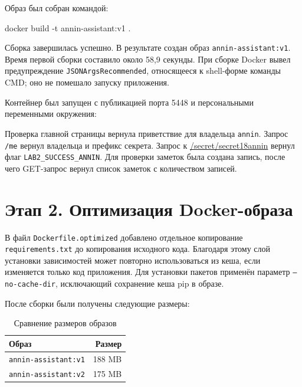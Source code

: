 Образ был собран командой:

\begin{code}
docker build -t annin-assistant:v1 .
\end{code}

Сборка завершилась успешно. В результате создан образ
\texttt{annin-assistant:v1}. Время первой сборки составило около
58,9 секунды. При сборке Docker вывел предупреждение
\texttt{JSONArgsRecommended}, относящееся к shell-форме команды CMD;
оно не помешало запуску приложения.


Контейнер был запущен с публикацией порта 5448 и персональными
переменными окружения:


Проверка главной страницы вернула приветствие для владельца
\texttt{annin}. Запрос \texttt{/me} вернул владельца и префикс секрета.
Запрос к \url{/secret/secret18annin} вернул флаг
\texttt{LAB2\_SUCCESS\_ANNIN}. Для проверки заметок была создана запись,
после чего GET-запрос вернул список заметок с количеством записей.


\section{Этап 2. Оптимизация Docker-образа}

В файл \texttt{Dockerfile.optimized} добавлено отдельное копирование
\texttt{requirements.txt} до копирования исходного кода. Благодаря этому
слой установки зависимостей может повторно использоваться из кеша,
если изменяется только код приложения. Для установки пакетов применён
параметр \texttt{--no-cache-dir}, исключающий сохранение кеша pip в образе.

После сборки были получены следующие размеры:

\begin{table}[H]
  \caption{Сравнение размеров образов}\label{tab:image-sizes}
  \centering
  \begin{tabularx}{\textwidth}{|X|r|}
    \hline
    Образ & Размер\\ \hline
    \texttt{annin-assistant:v1} & 188 MB\\ \hline
    \texttt{annin-assistant:v2} & 175 MB\\ \hline
  \end{tabularx}
\end{table}

